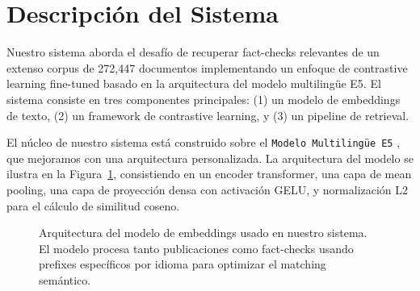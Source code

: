 \documentclass[11pt]{article}
\begin{document}
\section{Descripción del Sistema}

Nuestro sistema aborda el desafío de recuperar fact-checks relevantes de un extenso corpus de 272,447 documentos implementando un enfoque de contrastive learning fine-tuned basado en la arquitectura del modelo multilingüe E5. El sistema consiste en tres componentes principales: (1) un modelo de embeddings de texto, (2) un framework de contrastive learning, y (3) un pipeline de retrieval.

El núcleo de nuestro sistema está construido sobre el \texttt{Modelo Multilingüe E5} \cite{wang2024multilingual}, que mejoramos con una arquitectura personalizada. La arquitectura del modelo se ilustra en la Figura~\ref{fig:model-architecture}, consistiendo en un encoder transformer, una capa de mean pooling, una capa de proyección densa con activación GELU, y normalización L2 para el cálculo de similitud coseno.

\begin{figure}[h]
    \centering
    \caption{Arquitectura del modelo de embeddings usado en nuestro sistema. El modelo procesa tanto publicaciones como fact-checks usando prefixes específicos por idioma para optimizar el matching semántico.}
    \label{fig:model-architecture}
\end{figure}
\end{document}
